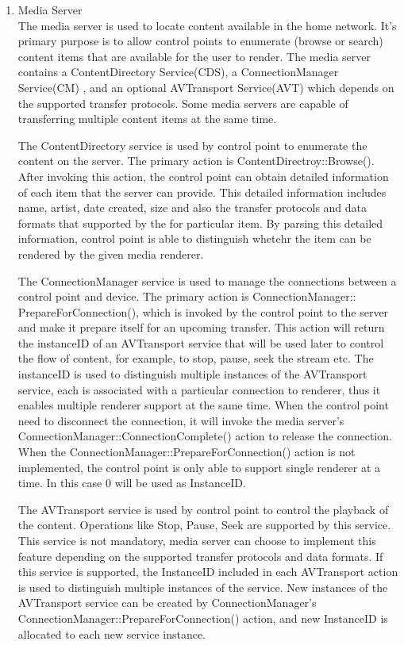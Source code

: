 \begin{enumerate}
\item Media Server \\
The media server is used to locate content available in the home network. It's
primary purpose is to allow control points to enumerate (browse or search)
content items that are available for the user to render. The media server
contains a ContentDirectory Service(CDS), a ConnectionManager Service(CM)
, and an optional AVTransport Service(AVT) which depends on the supported
transfer protocols. Some media servers are capable of transferring multiple
content items at the same time.

The ContentDirectory service is used by control point to enumerate the content
on the server. The primary action is ContentDirectroy::Browse(). After
invoking this action, the control point can obtain detailed information of each
item that the server can provide. This detailed information includes name,
artist, date created, size and also the transfer protocols and data formats that
supported by the for particular item. By parsing this detailed information,
control point is able to distinguish whetehr the item can be rendered by the
given media renderer.

The ConnectionManager service is used to manage the connections between a
control point and device. The primary action is
ConnectionManager:: PrepareForConnection(), which is invoked by the control
point to the server and make it prepare itself for an upcoming transfer. This
action will return the instanceID of an AVTransport service that will be used
later to control the flow of content, for example, to stop, pause, seek the
stream etc. The instanceID is used to distinguish multiple instances of the
AVTransport service, each is associated with a particular connection to
renderer, thus it enables multiple renderer support at the same time. When the
control point need to disconnect the connection, it will invoke the media
server's ConnectionManager::ConnectionComplete() action to release the
connection. When the ConnectionManager::PrepareForConnection() action is not
implemented, the control point is only able to support single renderer at a
time. In this case 0 will be used as InstanceID.

The AVTransport service is used by control point to control the playback of the
content. Operations like Stop, Pause, Seek are supported by this service. This
service is not mandatory, media server can choose to implement this feature
depending on the supported transfer protocols and data formats. If this service
is supported, the InstanceID included in each AVTransport action is used to
distinguish multiple instances of the service. New instances of the AVTransport
service can be created by ConnectionManager's
ConnectionManager::PrepareForConnection() action, and new InstanceID is
allocated to each new service instance.


\end{enumerate}
